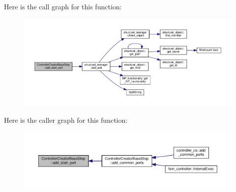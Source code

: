 Here is the call graph for this function\+:
\nopagebreak
\begin{figure}[H]
\begin{center}
\leavevmode
\includegraphics[width=350pt]{d5/d28/classControllerCreatorBaseStep_a7ed45c9688186b9d940d8eb50fead293_cgraph}
\end{center}
\end{figure}
Here is the caller graph for this function\+:
\nopagebreak
\begin{figure}[H]
\begin{center}
\leavevmode
\includegraphics[width=350pt]{d5/d28/classControllerCreatorBaseStep_a7ed45c9688186b9d940d8eb50fead293_icgraph}
\end{center}
\end{figure}
\mbox{\label{classControllerCreatorBaseStep_a786209eedbc7068e8a8d6f873cf25fc3}} 
